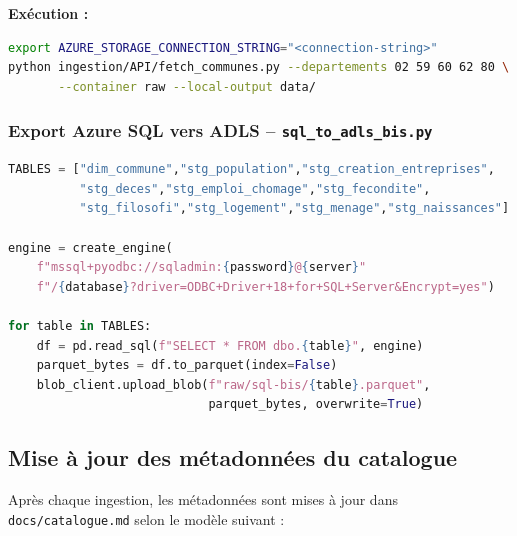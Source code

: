 \documentclass[12pt,a4paper]{article}
\begin{document}
\textbf{Exécution :}
\begin{lstlisting}[language=bash]
export AZURE_STORAGE_CONNECTION_STRING="<connection-string>"
python ingestion/API/fetch_communes.py --departements 02 59 60 62 80 \
       --container raw --local-output data/
\end{lstlisting}

\subsubsection{Export Azure SQL vers ADLS -- \texttt{sql\_to\_adls\_bis.py}}

\begin{lstlisting}[language=Python, caption=Extrait -- Export SQL vers Parquet ADLS (Annexe~\ref{annexe:sqlbis})]
TABLES = ["dim_commune","stg_population","stg_creation_entreprises",
          "stg_deces","stg_emploi_chomage","stg_fecondite",
          "stg_filosofi","stg_logement","stg_menage","stg_naissances"]

engine = create_engine(
    f"mssql+pyodbc://sqladmin:{password}@{server}"
    f"/{database}?driver=ODBC+Driver+18+for+SQL+Server&Encrypt=yes")

for table in TABLES:
    df = pd.read_sql(f"SELECT * FROM dbo.{table}", engine)
    parquet_bytes = df.to_parquet(index=False)
    blob_client.upload_blob(f"raw/sql-bis/{table}.parquet",
                            parquet_bytes, overwrite=True)
\end{lstlisting}

\subsection{Mise à jour des métadonnées du catalogue}

Après chaque ingestion, les métadonnées sont mises à jour dans \texttt{docs/catalogue.md} selon le modèle suivant :
\end{document}
